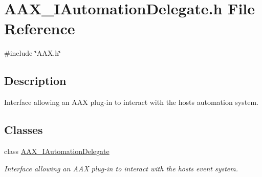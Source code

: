 \hypertarget{a00563}{}\section{A\+A\+X\+\_\+\+I\+Automation\+Delegate.\+h File Reference}
\label{a00563}
{\ttfamily \#include \char`\"{}A\+A\+X.\+h\char`\"{}}\newline


\subsection{Description}
Interface allowing an A\+AX plug-\/in to interact with the host\textquotesingle{}s automation system. 

\subsection*{Classes}
\begin{DoxyCompactItemize}
\item 
class \mbox{\hyperlink{a01773}{A\+A\+X\+\_\+\+I\+Automation\+Delegate}}
\begin{DoxyCompactList}\small\item\em Interface allowing an A\+AX plug-\/in to interact with the host\textquotesingle{}s event system. \end{DoxyCompactList}\end{DoxyCompactItemize}
